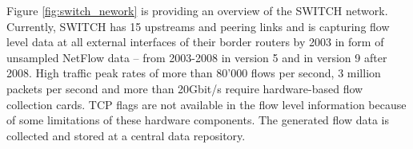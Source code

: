 Figure \ref{fig:switch_nework} is providing an overview of the SWITCH network. Currently, SWITCH has 15 upstreams and peering links and is capturing flow level data at all external interfaces of their border routers by 2003 in form of unsampled NetFlow data -- from 2003-2008 in version 5 and in version 9 after 2008\citep{Schatzmann:Tracing}.
High traffic peak rates of more than 80'000 flows per second, 3 million packets per second and more than 20Gbit/s require hardware-based flow collection cards. TCP flags are not available in the flow level information because of some limitations of these hardware components. The generated flow data is collected and stored at a central data repository.



